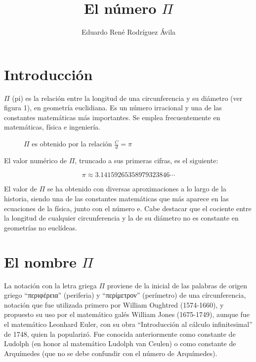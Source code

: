 \documentclass[12pt,letterpaper]{article}
\title{El número $\Pi$}
\author{Eduardo René Rodríguez Ávila}
\begin{document}
  \maketitle

\section{Introducción}

$\Pi$ (pi) es la relación entre la longitud de una circunferencia y su diámetro (ver figura 1), en geometría euclidiana. Es un número irracional y una de las constantes matemáticas más importantes. Se emplea frecuentemente en matemáticas, física e ingeniería. 

\begin{figure}[h] 
\centering
{}

\caption{$\Pi$ es obtenido por la relación $\frac{C}{d}  = \pi$}
\end{figure}



El valor numérico de $\Pi$, truncado a sus primeras cifras, es el siguiente:

\begin{displaymath}
  \pi  \approx  3.14159265358979323846 \cdots
\end{displaymath}

El valor de $\Pi$ se ha obtenido con diversas aproximaciones a lo largo de la historia, siendo una de las constantes matemáticas que más aparece en las ecuaciones de la física, junto con el número e. Cabe destacar que el co\-ciente entre la longitud de cualquier circunferencia y la de su diámetro no es constante en geometrías no euclídeas.

\section{El nombre $\Pi$}

La notación con la letra griega $\Pi$ proviene de la inicial de las palabras de origen griego ``\textgreek{περιφέρεια}'' (periferia) y ``\textgreek{περίμετρον}'' (perímetro) de una círcunferencia, notación que fue utilizada primero por William Oughtred (1574-1660), y propuesto su uso por el matemático galés William Jones (1675-1749), aunque fue el matemático Leonhard Euler, con su obra ``Introducción al cálculo infinitesimal'' de 1748, quien la popularizó. Fue conocida an\-te\-rior\-men\-te como constante de Ludolph (en honor al matemático Ludolph van Ceulen) o como constante de Arquímedes (que no se debe confundir con el número de Arquímedes).
\end{document}
